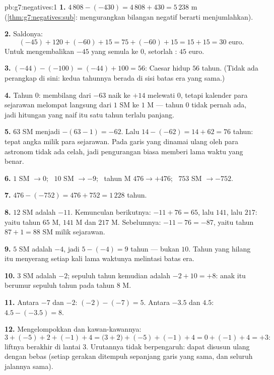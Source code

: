 \begin{solution}{pb:g7:negatives:1}
\textbf{1.} $4\,808 - (-430) = 4\,808 + 430 = 5\,238$ m
(\cref{thm:g7:negatives:sub}: mengurangkan bilangan negatif berarti
menjumlahkan).

\textbf{2.} Saldonya:
\[
(-45) + 120 + (-60) + 15 = 75 + (-60) + 15 = 15 + 15 = 30
\text{ euro}.
\]
Untuk mengembalikan $-45$ yang semula ke $0$, setorlah :
$45$ euro.

\textbf{3.} $(-44) - (-100) = (-44) + 100 = 56$: Caesar hidup
$56$ tahun. (Tidak ada perangkap di sini: kedua tahunnya berada di
sisi batas era yang sama.)

\textbf{4.} Tahun $0$: membilang dari $-63$ naik ke $+14$ melewati
$0$, tetapi kalender para sejarawan melompat langsung dari
$1$ SM ke $1$ M --- tahun $0$ tidak pernah ada, jadi hitungan yang
naif itu satu tahun terlalu panjang.

\textbf{5.} $63$ SM menjadi $-(63 - 1) = -62$. Lalu
$14 - (-62) = 14 + 62 = 76$ tahun: tepat angka milik para sejarawan.
Pada garis yang dinamai ulang oleh para astronom tidak ada celah,
jadi pengurangan biasa memberi lama waktu yang benar.

\textbf{6.} $1$ SM $\to 0$; \ $10$ SM $\to -9$; \ tahun M
$476 \to +476$; \ $753$ SM $\to -752$.

\textbf{7.} $476 - (-752) = 476 + 752 = 1\,228$ tahun.

\textbf{8.} $12$ SM adalah $-11$. Kemunculan berikutnya:
$-11 + 76 = 65$, lalu $141$, lalu $217$: yaitu tahun $65$ M, $141$
M dan $217$ M. Sebelumnya: $-11 - 76 = -87$, yaitu tahun
$87 + 1 = 88$ SM milik sejarawan.

\textbf{9.} $5$ SM adalah $-4$, jadi $5 - (-4) = 9$ tahun --- bukan
$10$. Tahun  yang hilang itu menyerang setiap kali lama waktunya
melintasi batas era.

\textbf{10.} $3$ SM adalah $-2$; sepuluh tahun kemudian adalah
$-2 + 10 = +8$: anak itu berumur sepuluh tahun pada tahun $8$ M.

\textbf{11.} Antara $-7$ dan $-2$: $(-2) - (-7) = 5$. Antara
$-3.5$ dan $4.5$: $4.5 - (-3.5) = 8$.

\textbf{12.} Mengelompokkan  dan kawan-kawannya:
\[
3 + (-5) + 2 + (-1) + 4
= \bigl(3 + 2\bigr) + (-5) + (-1) + 4
= 0 + (-1) + 4 = +3 :
\]
liftnya berakhir di lantai $3$. Urutannya tidak berpengaruh: 
 dapat disusun ulang dengan bebas (setiap gerakan
ditempuh sepanjang garis yang sama, dan seluruh jalannya sama).


\end{solution}
